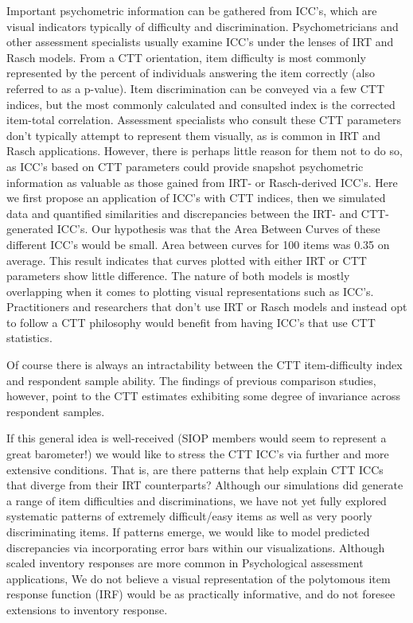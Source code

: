 \documentclass[
  jou]{apa6}
\begin{document}
Important psychometric information can be gathered from ICC's, which are visual indicators typically of difficulty and discrimination. Psychometricians and other assessment specialists usually examine ICC's under the lenses of IRT and Rasch models. From a CTT orientation, item difficulty is most commonly represented by the percent of individuals answering the item correctly (also referred to as a p-value). Item discrimination can be conveyed via a few CTT indices, but the most commonly calculated and consulted index is the corrected item-total correlation. Assessment specialists who consult these CTT parameters don't typically attempt to represent them visually, as is common in IRT and Rasch applications. However, there is perhaps little reason for them not to do so, as ICC's based on CTT parameters could provide snapshot psychometric information as valuable as those gained from IRT- or Rasch-derived ICC's. Here we first propose an application of ICC's with CTT indices, then we simulated data and quantified similarities and discrepancies between the IRT- and CTT-generated ICC's. Our hypothesis was that the Area Between Curves of these different ICC's would be small. Area between curves for 100 items was 0.35 on average. This result indicates that curves plotted with either IRT or CTT parameters show little difference. The nature of both models is mostly overlapping when it comes to plotting visual representations such as ICC's. Practitioners and researchers that don't use IRT or Rasch models and instead opt to follow a CTT philosophy would benefit from having ICC's that use CTT statistics.

Of course there is always an intractability between the CTT item-difficulty index and respondent sample ability. The findings of previous comparison studies, however, point to the CTT estimates exhibiting some degree of invariance across respondent samples.

If this general idea is well-received (SIOP members would seem to represent a great barometer!) we would like to stress the CTT ICC's via further and more extensive conditions. That is, are there patterns that help explain CTT ICCs that diverge from their IRT counterparts? Although our simulations did generate a range of item difficulties and discriminations, we have not yet fully explored systematic patterns of extremely difficult/easy items as well as very poorly discriminating items. If patterns emerge, we would like to model predicted discrepancies via incorporating error bars within our visualizations. Although scaled inventory responses are more common in Psychological assessment applications, We do not believe a visual representation of the polytomous item response function (IRF) would be as practically informative, and do not foresee extensions to inventory response.
\end{document}
